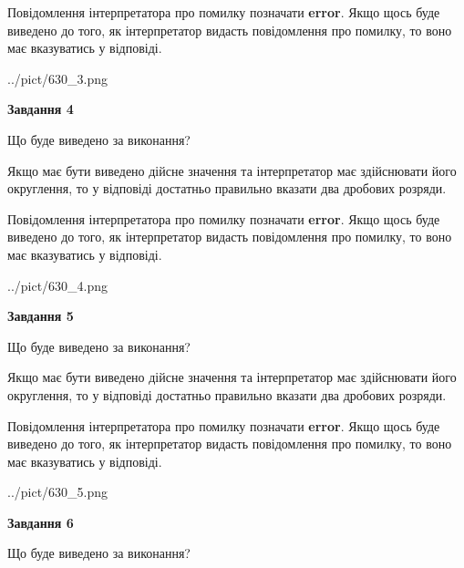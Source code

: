 \documentclass[12pt, ukrainian]{article}
\begin{document}
{\begin {Large}
Повідомлення інтерпретатора про помилку позначати \textbf{error}.
Якщо щось буде виведено до того, як інтерпретатор видасть повідомлення про помилку, 
то воно має вказуватись у відповіді. \par

\begin{center}
	{../pict/630_3.png}
\end{center}
\newpage

{\begin {center}\textbf{Завдання 4}\end {center}}\par
Що буде виведено за виконання? \par

Якщо має бути виведено дійсне значення та інтерпретатор має здійснювати його округлення, 
то у відповіді достатньо правильно вказати два дробових розряди.

Повідомлення інтерпретатора про помилку позначати \textbf{error}.
Якщо щось буде виведено до того, як інтерпретатор видасть повідомлення про помилку, 
то воно має вказуватись у відповіді. \par

\begin{center}
	{../pict/630_4.png}
\end{center}
\newpage

{\begin {center}\textbf{Завдання 5}\end {center}}\par
Що буде виведено за виконання? \par

Якщо має бути виведено дійсне значення та інтерпретатор має здійснювати його округлення, 
то у відповіді достатньо правильно вказати два дробових розряди.

Повідомлення інтерпретатора про помилку позначати \textbf{error}.
Якщо щось буде виведено до того, як інтерпретатор видасть повідомлення про помилку, 
то воно має вказуватись у відповіді. \par

\begin{center}
	{../pict/630_5.png}
\end{center}
\newpage

{\begin {center}\textbf{Завдання 6}\end {center}}\par
Що буде виведено за виконання? \par


\end{Large}}
\end{document}

